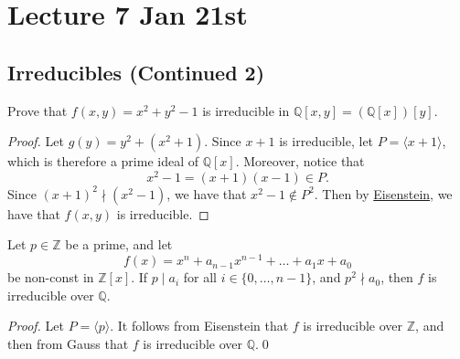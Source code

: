 \documentclass[notoc,notitlepage]{tufte-book}
\begin{document}


\chapter{Lecture 7 Jan 21st}%
\label{chp:lecture_7_jan_21st}

\section{Irreducibles (Continued 2)}%
\label{sec:irreducibles_continued_2}

\begin{eg}
  Prove that $f(x, y) = x^2 + y^2 - 1$ is irreducible in $\mathbb{Q}[x, y] = (\mathbb{Q}[x])[y]$.
\end{eg}

\begin{proof}
  Let $g(y) = y^2 + (x^2 + 1)$. Since $x + 1$ is irreducible, let $P = \langle x + 1 \rangle$,
  which is therefore a prime ideal of $\mathbb{Q}[x]$. Moreover, notice that
  \begin{equation*}
    x^2 - 1 = ( x + 1 )( x - 1 ) \in P.
  \end{equation*}
  Since $(x + 1)^2 \nmid \left(x^2 - 1\right)$, we have that $x^2 - 1 \notin P^2$. Then by
  \hyperref[propo:eisenstein_s_criterion]{Eisenstein}, we have that $f(x, y)$ is irreducible.
\end{proof}

\begin{crly}\label{crly:eisenstein_gauss}
  Let $p \in \mathbb{Z}$ be a prime, and let
  \begin{equation*}
    f(x) = x^n + a_{n - 1} x^{n - 1} + \hdots + a_1 x + a_0
  \end{equation*}
  be non-const in $\mathbb{Z}[x]$. If $p \mid a_i$ for all $i \in \{0, \ldots, n - 1\}$, and
  $p^2 \nmid a_0$, then $f$ is irreducible over $\mathbb{Q}$.
\end{crly}


\begin{proof}
  Let $P = \langle p \rangle$. It follows from Eisenstein that $f$ is irreducible over $\mathbb{Z}$,
  and then from Gauss that $f$ is irreducible over $\mathbb{Q}$.\qed\
\end{proof}
\end{document}

